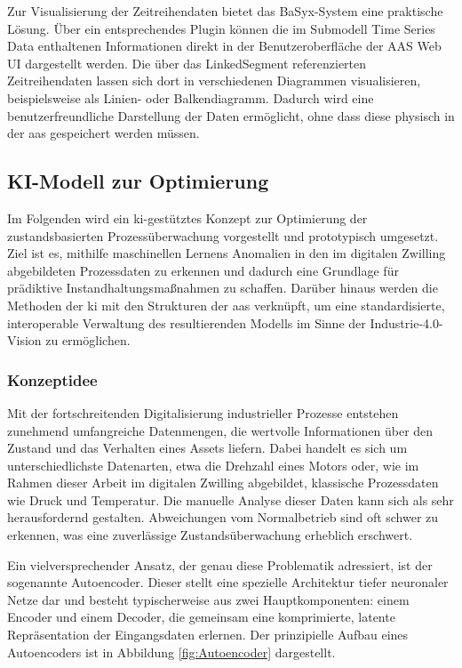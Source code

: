 Zur Visualisierung der Zeitreihendaten bietet das BaSyx-System eine praktische Lösung.
Über ein entsprechendes Plugin können die im Submodell Time Series Data enthaltenen Informationen direkt in der Benutzeroberfläche der AAS Web UI dargestellt werden.
Die über das LinkedSegment referenzierten Zeitreihendaten lassen sich dort in verschiedenen Diagrammen visualisieren, beispielsweise als Linien- oder Balkendiagramm.
Dadurch wird eine benutzerfreundliche Darstellung der Daten ermöglicht, ohne dass diese physisch in der \acs{aas} gespeichert werden müssen.

\subsection{KI-Modell zur Optimierung}
Im Folgenden wird ein \acs{ki}-gestütztes Konzept zur Optimierung der zustandsbasierten Prozessüberwachung vorgestellt und prototypisch umgesetzt.
Ziel ist es, mithilfe maschinellen Lernens Anomalien in den im digitalen Zwilling abgebildeten Prozessdaten zu erkennen und dadurch eine Grundlage für prädiktive Instandhaltungsmaßnahmen zu schaffen.
Darüber hinaus werden die Methoden der \acs{ki} mit den Strukturen der \acs{aas} verknüpft, um eine standardisierte, interoperable Verwaltung des resultierenden Modells im Sinne der Industrie-4.0-Vision zu ermöglichen.

\subsubsection{Konzeptidee}
Mit der fortschreitenden Digitalisierung industrieller Prozesse entstehen zunehmend umfangreiche Datenmengen, die wertvolle Informationen über den Zustand und das Verhalten eines Assets liefern. 
Dabei handelt es sich um unterschiedlichste Datenarten, etwa die Drehzahl eines Motors oder, wie im Rahmen dieser Arbeit im digitalen Zwilling abgebildet, klassische Prozessdaten wie Druck und Temperatur.
Die manuelle Analyse dieser Daten kann sich als sehr herausfordernd gestalten. Abweichungen vom Normalbetrieb sind oft schwer zu erkennen, was eine zuverlässige Zustandsüberwachung erheblich erschwert.

Ein vielversprechender Ansatz, der genau diese Problematik adressiert, ist der sogenannte Autoencoder. 
Dieser stellt eine spezielle Architektur tiefer neuronaler Netze dar und besteht typischerweise aus zwei Hauptkomponenten: einem Encoder und einem Decoder, die gemeinsam eine komprimierte, latente Repräsentation der Eingangsdaten erlernen.
\cite{Lempitsky2019}
Der prinzipielle Aufbau eines Autoencoders ist in Abbildung \ref{fig:Autoencoder} dargestellt.

